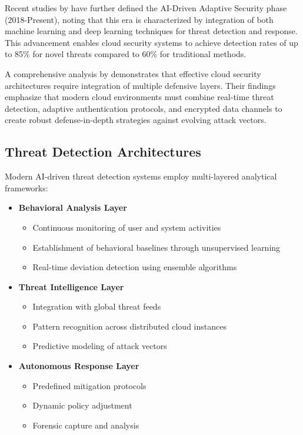 \documentclass[a4paper,12pt]{article}
\begin{document}
Recent studies by \citet{belal2022} have further defined the AI-Driven Adaptive Security phase (2018-Present), noting that this era is characterized by integration of both machine learning and deep learning techniques for threat detection and response. This advancement enables cloud security systems to achieve detection rates of up to 85\% for novel threats compared to 60\% for traditional methods.

A comprehensive analysis by \citet{alouffi2021} demonstrates that effective cloud security architectures require integration of multiple defensive layers. Their findings emphasize that modern cloud environments must combine real-time threat detection, adaptive authentication protocols, and encrypted data channels to create robust defense-in-depth strategies against evolving attack vectors.

\subsection{Threat Detection Architectures}
Modern AI-driven threat detection systems employ multi-layered analytical frameworks:
\begin{itemize}
    \item \textbf{Behavioral Analysis Layer}
          \begin{itemize}
              \item Continuous monitoring of user and system activities
              \item Establishment of behavioral baselines through unsupervised learning
              \item Real-time deviation detection using ensemble algorithms
          \end{itemize}
    \item \textbf{Threat Intelligence Layer}
          \begin{itemize}
              \item Integration with global threat feeds
              \item Pattern recognition across distributed cloud instances
              \item Predictive modeling of attack vectors
          \end{itemize}
    \item \textbf{Autonomous Response Layer}
          \begin{itemize}
              \item Predefined mitigation protocols
              \item Dynamic policy adjustment
              \item Forensic capture and analysis
          \end{itemize}
\end{itemize}
\end{document}
